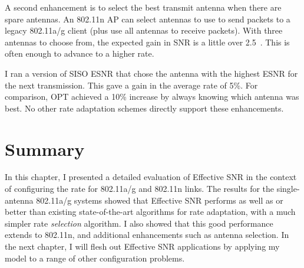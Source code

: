 A second enhancement is to select the best transmit antenna when there are spare antennas. An 802.11n AP can select antennas to use to send packets to a legacy 802.11a/g client (plus use all antennas to receive packets). With three antennas to choose from, the expected gain in SNR is a little over 2.5\dB~\cite{Goldsmith}. This is often enough to advance to a higher rate.

I ran a version of SISO ESNR that chose the antenna with the highest ESNR for the next transmission. This gave a gain in the average rate of 5\%.  For comparison, OPT achieved a 10\% increase by always knowing which antenna was best. No other rate adaptation schemes directly support these enhancements.

\section{Summary}
In this chapter, I presented a detailed evaluation of Effective SNR in the context of configuring the rate for 802.11a/g and 802.11n links. The results for the single-antenna 802.11a/g systems showed that Effective SNR performs as well as or better than existing state-of-the-art algorithms for rate adaptation, with a much simpler rate \emph{selection} algorithm. I also showed that this good performance extends to 802.11n, and additional enhancements such as antenna selection. In the next chapter, I will flesh out Effective SNR applications by applying my model to a range of other configuration problems.

\ifx\mainfile\undefined

\fi
